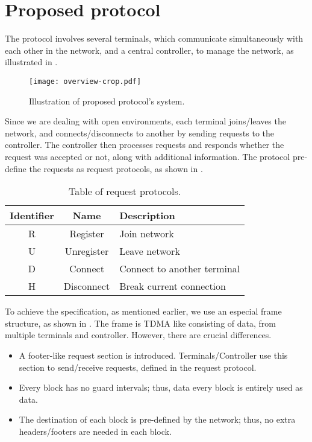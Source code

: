 ﻿\documentclass[twocolumn,9pt]{ltjsarticle}
\renewcommand{\ref}{\Cref}
\begin{document}
\section{Proposed protocol}
The protocol involves several terminals, which communicate simultaneously with each other in the network, and a central controller, to manage the network, as illustrated in \ref{fig:overview}.

\begin{figure}[tb]
  \centering
  \texttt{[image: overview-crop.pdf]}
  \caption{\label{fig:overview}
    Illustration of proposed protocol's system.
  }
\end{figure}

Since we are dealing with open environments, each terminal joins/leaves the network, and connects/disconnects to another by sending requests to the controller.
The controller then processes requests and responds whether the request was accepted or not, along with additional information.
The protocol pre-define the requests as request protocols, as shown in \ref{tab:request}.

\begin{table}[tb]
  \centering
  \caption{\label{tab:request}
    Table of request protocols.
  }
  \begin{tabularx}{\linewidth}{ccl}
    \hline
    Identifier & Name & Description\\
    \hline \hline
    R & Register & Join network\\
    U & Unregister & Leave network\\
    D & Connect & Connect to another terminal\\
    H & Disconnect & Break current connection\\
    \hline
  \end{tabularx}
\end{table}

To achieve the specification, as mentioned earlier, we use an especial frame structure, as shown in \ref{fig:frame}.
The frame is TDMA like consisting of data, from multiple terminals and controller.
However, there are crucial differences.
\begin{itemize}
\item A footer-like request section is introduced.
  Terminals/Controller use this section to send/receive requests, defined in the request protocol.
\item Every block has no guard intervals; thus, data every block is entirely used as data.
\item The destination of each block is pre-defined by the network; thus, no extra headers/footers are needed in each block.
\end{itemize}
\end{document}
